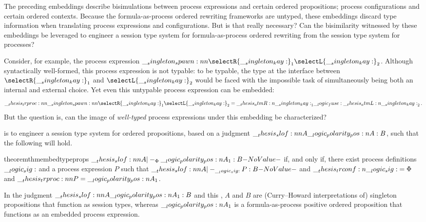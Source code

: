 The preceding embeddings describe bisimulations between process expressions and certain ordered propositions; process configurations and certain ordered contexts.
Because the formula-as-process ordered rewriting frameworks are untyped, these embeddings discard type information when translating process expressions and configurations.
But is that really necessary?
Can the bisimilarity witnessed by these embeddings be leveraged to engineer a session type system for formula-as-process ordered rewriting from the session type system for processes?

Consider, for example, the process expression $\spawn{\selectR{\kay}_1}{\selectL{\kay}_2}$.
Although syntactically well-formed, this process expression is not typable: to be typable, the type at the interface between $\selectR{\kay}_1$ and $\selectL{\kay}_2$ would be faced with the impossible task of simultaneously being both an internal and external choice.
Yet even this untypable process expression can be embedded:
\begin{equation*}
  \trproc{\spawn{\selectR{\kay}_1}{\selectL{\kay}_2}}
    = \atmR{\kay}_1 \fuse \atmL{\kay}_2
  \,.
\end{equation*}
But the question is, can the image of \emph{well-typed} process expressions under this embedding be characterized?

 is to engineer a session type system for ordered propositions, based on a judgment $\slof{A |- \p{A} : B}$, such that the following  will hold.
%
\begin{restatable}[
  label=thm:embed:type-props
]{theorem}{thmembedtypeprops}
  $\slof{A |-_{\orsig} \p{A}_1 : B}$ if, and only if, there exist process definitions $\__logic_sig:$ and a process expression $P$ such that $\slof{A |-_{\sig} P : B}$ and $\__thesis_trconf:n {\__logic_sig:} = \Phi$ and $\trproc{P} = \p{A}_1$.
\end{restatable}
%
\noindent
In the judgment $\slof{A |- \p{A}_1 : B}$ and this , $A$ and $B$ are (Curry--Howard interpretations of) singleton propositions that function as session types, where\-as $\__logic_polarity_pos:n {A}_1$ is a formula-as-process positive ordered proposition that functions as an embedded process expression.

